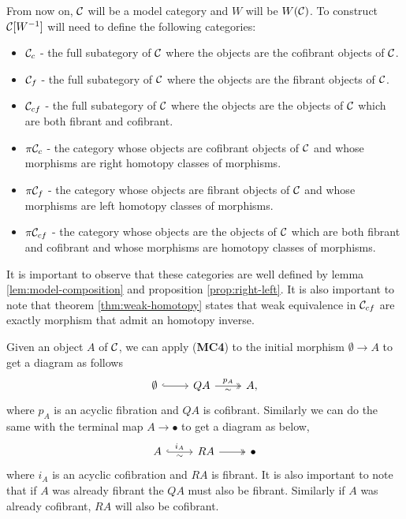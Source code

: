 From now on, $\mathcal{C}$ will be a model category and $W$ will be $W(\mathcal{C})$.
To construct $\mathcal{C}[W^{-1}]$ will need to define the following categories:
\begin{itemize}
	\item $\mathcal{C}_c$ - the full subategory of $\mathcal{C}$ where the objects are the cofibrant objects of $\mathcal{C}$.
	\item $\mathcal{C}_f$ - the full subategory of $\mathcal{C}$ where the objects are the fibrant objects of $\mathcal{C}$.
	\item $\mathcal{C}_{cf}$ - the full subategory of $\mathcal{C}$ where the objects are the objects of $\mathcal{C}$ which are both fibrant and cofibrant.
	\item $\pi \mathcal{C}_c$ - the category whose objects are cofibrant objects of $\mathcal{C}$ and whose morphisms are right homotopy classes of morphisms. 
	\item $\pi \mathcal{C}_f$ - the category whose objects are fibrant objects of $\mathcal{C}$ and whose morphisms are left homotopy classes of morphisms. 
	\item $\pi \mathcal{C}_{cf}$ - the category whose objects are the objects of $\mathcal{C}$ which are both fibrant and cofibrant and whose morphisms are homotopy classes of morphisms. 
\end{itemize}
It is important to observe that these categories are well defined by lemma \ref{lem:model-composition} and proposition \ref{prop:right-left}. It is also important to note that theorem \ref{thm:weak-homotopy} states that weak equivalence in $\mathcal{C}_{cf}$ are exactly morphism that admit an homotopy inverse.

\begin{remark}
	Given an object $A$ of $\mathcal{C}$, we can apply (\textbf{MC4}) to the initial morphism $\emptyset \longrightarrow A$ to get a diagram as follows
	\[\begin{tikzcd}
		\emptyset & QA & {A,}
		\arrow[hook, from=1-1, to=1-2]
		\arrow["{p_A}", "\sim"', two heads, from=1-2, to=1-3]
	\end{tikzcd}\]
	where $p_A$ is an acyclic fibration and $QA$ is cofibrant. Similarly we can do the same with the terminal map $A \longrightarrow \bullet$ to get a diagram as below,
	\[\begin{tikzcd}
		A & RA & \bullet
		\arrow["{i_A}", "\sim"', hook, from=1-1, to=1-2]
		\arrow[two heads, from=1-2, to=1-3]
	\end{tikzcd}\]
	where $i_A$ is an acyclic cofibration and $RA$ is fibrant. It is also important to note that if $A$ was already fibrant the $QA$ must also be fibrant. Similarly if $A$ was already cofibrant, $RA$ will also be cofibrant. 
	
\end{remark}


